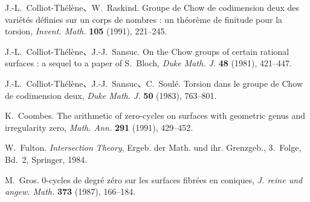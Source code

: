 \begin{description}[leftmargin=3.4em,labelsep=.5em,font=\normalfont]
\item[{[CR3]}] J.-L.~Colliot-Thélène、W.~Raskind. Groupe de Chow de codimension deux des variétés définies sur un corps de nombres : un théorème de finitude pour la torsion, \textit{Invent. Math.} \textbf{105} (1991), 221--245.
\item[{[CS]}] J.-L.~Colliot-Thélène、J.-J.~Sansuc. On the Chow groups of certain rational surfaces : a sequel to a paper of S.~Bloch, \textit{Duke Math. J.} \textbf{48} (1981), 421--447.
\item[{[CSS]}] J.-L.~Colliot-Thélène、J.-J.~Sansuc、C.~Soulé. Torsion dans le groupe de Chow de codimension deux, \textit{Duke Math. J.} \textbf{50} (1983), 763--801.
\item[{[Cb]}] K.~Coombes. The arithmetic of zero-cycles on surfaces with geometric genus and irregularity zero, \textit{Math. Ann.} \textbf{291} (1991), 429--452.
\item[{[F]}] W.~Fulton. \textit{Intersection Theory}, Ergeb. der Math. und ihr. Grenzgeb., 3.~Folge, Bd.~2, Springer, 1984.
\item[{[G]}] M.~Gros. $0$-cycles de degré zéro sur les surfaces fibrées en coniques, \textit{J. reine und angew. Math.} \textbf{373} (1987), 166--184.
\end{description}

